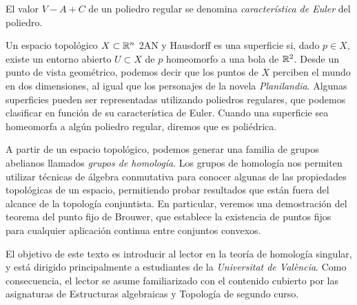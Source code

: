 El valor $V-A+C$ de un poliedro regular se denomina \emph{característica de Euler} del poliedro.

Un espacio topológico $X \subset \mathbb{R}^n$ 2AN y Hausdorff es una superficie si, dado $p \in X$, existe un entorno abierto $U \subset X$ de $p$ homeomorfo a una bola de $\mathbb{R}^2$. Desde un punto de vista geométrico, podemos decir que los puntos de $X$ perciben el mundo en dos dimensiones, al igual que los personajes de la novela \emph{Planilandia}. Algunas superficies pueden ser representadas utilizando poliedros regulares, que podemos clasificar en función de su característica de Euler. Cuando una superficie sea homeomorfa a algún poliedro regular, diremos que es poliédrica.

A partir de un espacio topológico, podemos generar una familia de grupos abelianos llamados \emph{grupos de homología}. Los grupos de homología nos permiten utilizar técnicas de álgebra conmutativa para conocer algunas de las propiedades topológicas de un espacio, permitiendo probar resultados que están fuera del alcance de la topología conjuntista. En particular, veremos una demostración del teorema del punto fijo de Brouwer, que establece la existencia de puntos fijos para cualquier aplicación continua entre conjuntos convexos.

El objetivo de este texto es introducir al lector en la teoría de homología singular, y está dirigido principalmente a estudiantes de la \emph{Universitat de València}. Como consecuencia, el lector se asume familiarizado con el contenido cubierto por las asignaturas de Estructuras algebraicas y Topología de segundo curso.
